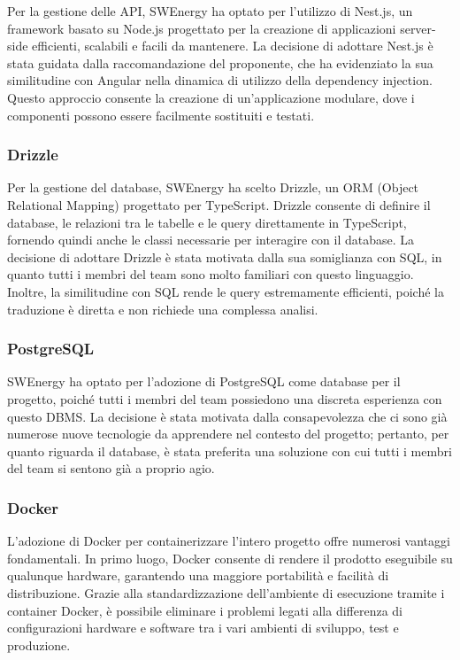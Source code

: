 Per la gestione delle API, SWEnergy ha optato per l'utilizzo di Nest.js, un
framework basato su Node.js progettato per la creazione di applicazioni
server-side efficienti, scalabili e facili da mantenere. La decisione di
adottare Nest.js è stata guidata dalla raccomandazione del proponente, che ha
evidenziato la sua similitudine con Angular nella dinamica di utilizzo della
dependency injection. Questo approccio consente la creazione di un'applicazione
modulare, dove i componenti possono essere facilmente sostituiti e testati.

\subsubsection{Drizzle}

Per la gestione del database, SWEnergy ha scelto Drizzle, un ORM (Object
Relational Mapping) progettato per TypeScript. Drizzle consente di definire il
database, le relazioni tra le tabelle e le query direttamente in TypeScript,
fornendo quindi anche le classi necessarie per interagire con il database. La
decisione di adottare Drizzle è stata motivata dalla sua somiglianza con SQL, in
quanto tutti i membri del team sono molto familiari con questo linguaggio.
Inoltre, la similitudine con SQL rende le query estremamente efficienti, poiché
la traduzione è diretta e non richiede una complessa analisi.

\subsubsection{PostgreSQL}

SWEnergy ha optato per l'adozione di PostgreSQL come database per il progetto,
poiché tutti i membri del team possiedono una discreta esperienza con questo
DBMS. La decisione è stata motivata dalla consapevolezza che ci sono già
numerose nuove tecnologie da apprendere nel contesto del progetto; pertanto, per
quanto riguarda il database, è stata preferita una soluzione con cui tutti i
membri del team si sentono già a proprio agio.

\subsubsection{Docker}

L'adozione di Docker per containerizzare l'intero progetto offre numerosi
vantaggi fondamentali. In primo luogo, Docker consente di rendere il prodotto
eseguibile su qualunque hardware, garantendo una maggiore portabilità e facilità
di distribuzione. Grazie alla standardizzazione dell'ambiente di esecuzione
tramite i container Docker, è possibile eliminare i problemi legati alla
differenza di configurazioni hardware e software tra i vari ambienti di
sviluppo, test e produzione.


